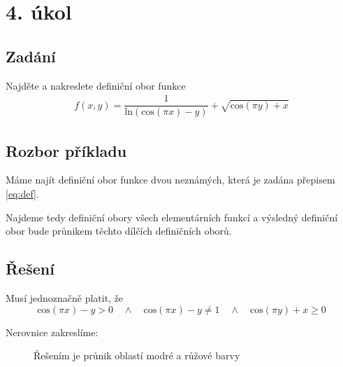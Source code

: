 \section{4. úkol}
\subsection*{Zadání}
Najděte a nakreslete definiční obor funkce 
\begin{eqnarray}f(x,y) = \dfrac{1}{\mathrm{ln}(\mathrm{cos}(\pi x) - y)} + \sqrt{\mathrm{cos}(\pi y) + x}
\label{eq:def}
\end{eqnarray}
\subsection*{Rozbor příkladu}
Máme najít definiční obor funkce dvou neznámých, která je zadána přepisem \ref{eq:def}. 

Najdeme tedy definiční obory všech elementárních funkcí a výsledný definiční obor bude průnikem těchto dílčích definičních oborů.

\subsection*{Řešení}
Musí jednoznačně platit, že
\begin{displaymath}
\mbox{cos}(\pi x) - y  > 0 \quad \wedge \quad \mbox{cos}(\pi x) - y \neq 1 \quad \wedge \quad \mbox{cos}(\pi y) + x \geq 0
\end{displaymath}

\noindent Nerovnice zakreslíme:

\begin{figure}[H]
	\centering
	
	\caption{Řešením je průnik oblastí modré a růžové barvy}
\end{figure}